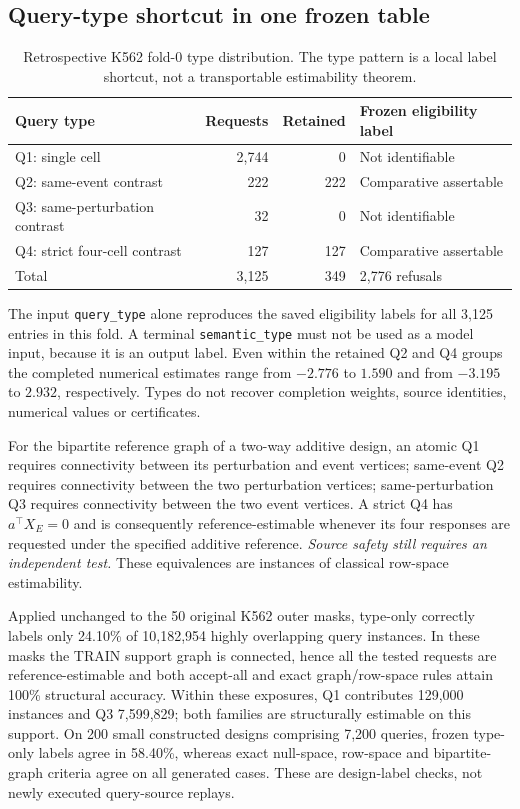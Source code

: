 \subsection{Query-type shortcut in one frozen table}
\begin{table}[htbp]
\centering\small
\caption{Retrospective K562 fold-0 type distribution. The type pattern is a local label shortcut, not a transportable estimability theorem.}
\label{tab:native-type}
\begin{tabularx}{\textwidth}{@{}Xrrl@{}}
\toprule Query type & Requests & Retained & Frozen eligibility label\\\midrule
Q1: single cell & 2,744 & 0 & Not identifiable\\
Q2: same-event contrast & 222 & 222 & Comparative assertable\\
Q3: same-perturbation contrast & 32 & 0 & Not identifiable\\
Q4: strict four-cell contrast & 127 & 127 & Comparative assertable\\\midrule
Total & 3,125 & 349 & 2,776 refusals\\\bottomrule
\end{tabularx}
\end{table}
The input \texttt{query\_type} alone reproduces the saved eligibility labels for all 3,125 entries in this fold. A terminal \texttt{semantic\_type} must not be used as a model input, because it is an output label. Even within the retained Q2 and Q4 groups the completed numerical estimates range from $-2.776$ to $1.590$ and from $-3.195$ to $2.932$, respectively. Types do not recover completion weights, source identities, numerical values or certificates.

For the bipartite reference graph of a two-way additive design, an atomic Q1 requires connectivity between its perturbation and event vertices; same-event Q2 requires connectivity between the two perturbation vertices; same-perturbation Q3 requires connectivity between the two event vertices. A strict Q4 has $a^\top X_E=0$ and is consequently reference-estimable whenever its four responses are requested under the specified additive reference. \emph{Source safety still requires an independent test.} These equivalences are instances of classical row-space estimability.

Applied unchanged to the 50 original K562 outer masks, type-only correctly labels only 24.10\% of 10,182,954 highly overlapping query instances. In these masks the TRAIN support graph is connected, hence all the tested requests are reference-estimable and both accept-all and exact graph/row-space rules attain 100\% structural accuracy. Within these exposures, Q1 contributes 129,000 instances and Q3 7,599,829; both families are structurally estimable on this support. On 200 small constructed designs comprising 7,200 queries, frozen type-only labels agree in 58.40\%, whereas exact null-space, row-space and bipartite-graph criteria agree on all generated cases. These are design-label checks, not newly executed query-source replays.

